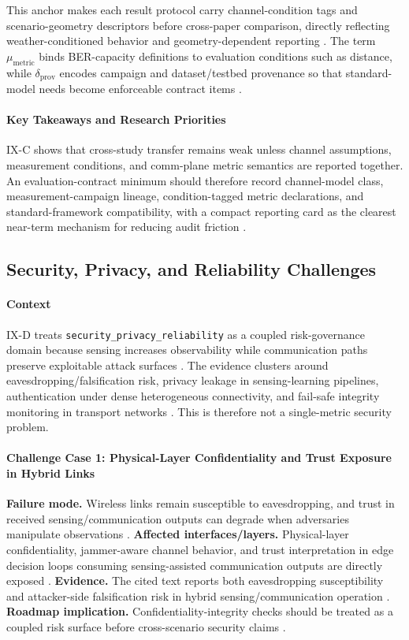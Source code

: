 \documentclass[letterpaper,journal]{IEEEtran}
\begin{document}
This anchor makes each result protocol carry channel-condition tags and scenario-geometry descriptors before cross-paper comparison, directly reflecting weather-conditioned behavior and geometry-dependent reporting \cite{O_ISAC_005, O_ISAC_327}. The term $\mu_{\mathrm{metric}}$ binds BER-capacity definitions to evaluation conditions such as distance, while $\delta_{\mathrm{prov}}$ encodes campaign and dataset/testbed provenance so that standard-model needs become enforceable contract items \cite{O_ISAC_381, O_ISAC_327}.

\paragraph{Key Takeaways and Research Priorities}
IX-C shows that cross-study transfer remains weak unless channel assumptions, measurement conditions, and comm-plane metric semantics are reported together. An evaluation-contract minimum should therefore record channel-model class, measurement-campaign lineage, condition-tagged metric declarations, and standard-framework compatibility, with a compact reporting card as the clearest near-term mechanism for reducing audit friction \cite{O_ISAC_327, O_ISAC_381}.

\subsection{Security, Privacy, and Reliability Challenges}

\paragraph{Context}
IX-D treats \texttt{security\_privacy\_reliability} as a coupled risk-governance domain because sensing increases observability while communication paths preserve exploitable attack surfaces \cite{O_ISAC_145, O_ISAC_039}. The evidence clusters around eavesdropping/falsification risk, privacy leakage in sensing-learning pipelines, authentication under dense heterogeneous connectivity, and fail-safe integrity monitoring in transport networks \cite{O_ISAC_145, O_ISAC_039, O_ISAC_156, O_ISAC_041}. This is therefore not a single-metric security problem.

\paragraph{Challenge Case 1: Physical-Layer Confidentiality and Trust Exposure in Hybrid Links}
\textbf{Failure mode.} Wireless links remain susceptible to eavesdropping, and trust in received sensing/communication outputs can degrade when adversaries manipulate observations \cite{O_ISAC_145}. \textbf{Affected interfaces/layers.} Physical-layer confidentiality, jammer-aware channel behavior, and trust interpretation in edge decision loops consuming sensing-assisted communication outputs are directly exposed \cite{O_ISAC_145}. \textbf{Evidence.} The cited text reports both eavesdropping susceptibility and attacker-side falsification risk in hybrid sensing/communication operation \cite{O_ISAC_145}. \textbf{Roadmap implication.} Confidentiality-integrity checks should be treated as a coupled risk surface before cross-scenario security claims \cite{O_ISAC_145}.
\end{document}

